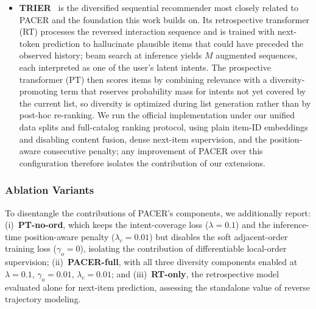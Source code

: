 \begin{itemize}
    \item \textbf{TRIER}~\cite{shi2024trier} is the diversified sequential recommender most closely related to PACER and the foundation this work builds on. Its retrospective transformer (RT) processes the reversed interaction sequence and is trained with next-token prediction to hallucinate plausible items that could have preceded the observed history; beam search at inference yields $M$ augmented sequences, each interpreted as one of the user's latent intents. The prospective transformer (PT) then scores items by combining relevance with a diversity-promoting term that reserves probability mass for intents not yet covered by the current list, so diversity is optimized during list generation rather than by post-hoc re-ranking. We run the official implementation under our unified data splits and full-catalog ranking protocol, using plain item-ID embeddings and disabling content fusion, dense next-item supervision, and the position-aware consecutive penalty; any improvement of PACER over this configuration therefore isolates the contribution of our extensions.
\end{itemize}

\subsubsection{Ablation Variants}
To disentangle the contributions of PACER's components, we additionally report: (i)~\textbf{PT-no-ord}, which keeps the intent-coverage loss ($\lambda=0.1$) and the inference-time position-aware penalty ($\lambda_c=0.01$) but disables the soft adjacent-order training loss ($\gamma_o=0$), isolating the contribution of differentiable local-order supervision; (ii)~\textbf{PACER-full}, with all three diversity components enabled at $\lambda=0.1$, $\gamma_o=0.01$, $\lambda_c=0.01$; and (iii)~\textbf{RT-only}, the retrospective model evaluated alone for next-item prediction, assessing the standalone value of reverse trajectory modeling.
